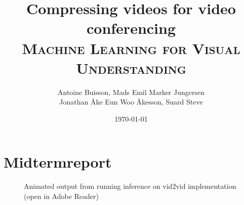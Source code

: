 \documentclass[a4paper, 12pt]{article}
\title{Compressing videos for video conferencing \\{\large \textsc{Machine Learning for Visual Understanding}}}
\author{Antoine Buisson, Mads Emil Marker Jungersen \\ Jonathan Åke Eun Woo Åkesson, 
Suard Steve}
\date{\today}
\begin{document}
\maketitle
\section*{Midtermreport}
\begin{center}
\end{center}


\begin{figure} 
\centerline{}
\caption{Animated output from running inference on vid2vid implementation (open in Adobe Reader)}
\label{fig_face_vid2vid.png}
\end{figure}
\end{document}
